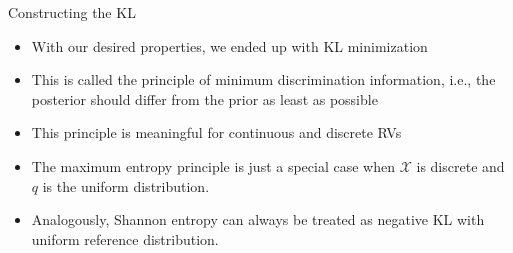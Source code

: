 \documentclass[11pt,compress,t,notes=noshow, xcolor=table]{beamer}
\begin{document}
\begin{vbframe}{Constructing the KL}
    \begin{itemize}
        \item With our desired properties, we ended up with KL minimization
        \item This is called the principle of minimum discrimination information, i.e., the posterior should differ from the prior as least as possible
        \item This principle is meaningful for continuous and discrete RVs
        \item The maximum entropy principle is just a special case when $\mathcal{X}$ is discrete and $q$ is the uniform distribution.
        \item Analogously, Shannon entropy can always be treated as negative KL  with uniform reference distribution.
    \end{itemize}
    
\end{vbframe}
\endlecture
\end{document}
